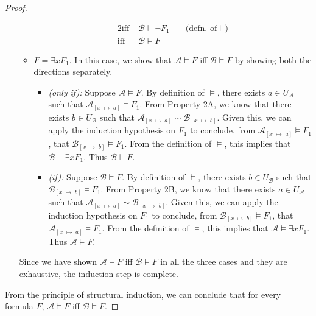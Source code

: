 \documentclass[
  12pt,
  oneside]{article}
\theoremstyle{definition}
\newcommand\satisfies{\vDash}
\begin{document}
\begin{proof}
\begin{itemize}
\begin{itemize}
\begin{alignat*}{2}
                    \text{iff}&\; \mathcal{B} \satisfies \neg F_1 &&\; \text{(defn. of } \satisfies \text{)} \\
                    \text{iff}&\; \mathcal{B} \satisfies F
                \end{alignat*}
            \item $F = \exists x F_1$. In this case, we show that $\mathcal{A} \satisfies F$ iff $\mathcal{B} \satisfies F$ by showing both the directions separately.
                \begin{itemize}
                    \item \emph{(only if):} Suppose $\mathcal{A} \satisfies F$. By definition of $\satisfies$, there exists $a \in U_{\mathcal{A}}$ such that $\mathcal{A}_{[x \;\mapsto\; a]} \satisfies F_1$. From Property 2A, we know that there exists $b \in U_{\mathcal{B}}$ such that $\mathcal{A}_{[x \;\mapsto\; a]} \sim \mathcal{B}_{[x \;\mapsto\; b]}$. Given this, we can apply the induction hypothesis on $F_1$ to conclude, from $\mathcal{A}_{[x \;\mapsto\; a]} \satisfies F_1$, that $\mathcal{B}_{[x \;\mapsto\; b]} \satisfies F_1$. From the definition of $\satisfies$, this implies that $\mathcal{B} \satisfies \exists x F_1$. Thus $\mathcal{B} \satisfies F$.
                    \item \emph{(if):} Suppose $\mathcal{B} \satisfies F$. By definition of $\satisfies$, there exists $b \in U_{\mathcal{B}}$ such that $\mathcal{B}_{[x \;\mapsto\; b]} \satisfies F_1$. From Property 2B, we know that there exists $a \in U_{\mathcal{A}}$ such that $\mathcal{A}_{[x \;\mapsto\; a]} \sim \mathcal{B}_{[x \;\mapsto\; b]}$. Given this, we can apply the induction hypothesis on $F_1$ to conclude, from $\mathcal{B}_{[x \;\mapsto\; b]} \satisfies F_1$, that $\mathcal{A}_{[x \;\mapsto\; a]} \satisfies F_1$. From the definition of $\satisfies$, this implies that $\mathcal{A} \satisfies \exists x F_1$. Thus $\mathcal{A} \satisfies F$.
                \end{itemize}
        \end{itemize}
        Since we have shown $\mathcal{A} \satisfies F$ iff $\mathcal{B} \satisfies F$ in all the three cases and they are exhaustive, the induction step is complete.
    \end{itemize}

    From the principle of structural induction, we can conclude that for every formula $F$, $\mathcal{A} \satisfies F$ iff $\mathcal{B} \satisfies F$.
\end{proof}
\end{document}
